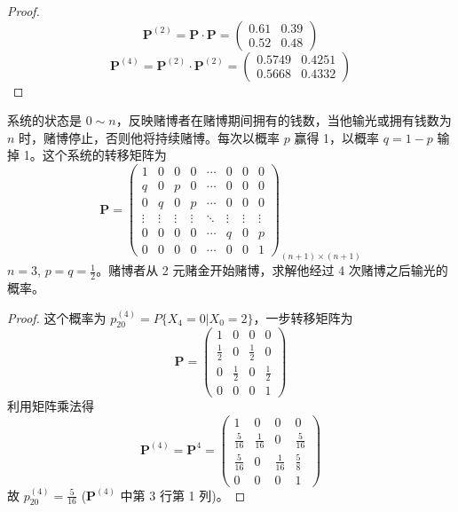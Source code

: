 \documentclass[lang=cn,10pt,thmcnt=section]{elegantbook}
\begin{document}
\begin{proof}
	\[
\mathbf{P}^{(2)} = \mathbf{P} \cdot \mathbf{P} = \begin{pmatrix}
0.61 & 0.39 \\
0.52 & 0.48
\end{pmatrix}
\]
\[
\mathbf{P}^{(4)} = \mathbf{P}^{(2)} \cdot \mathbf{P}^{(2)} = \begin{pmatrix}
0.5749 & 0.4251 \\
0.5668 & 0.4332
\end{pmatrix}
\]
\end{proof}
\begin{example}
	系统的状态是 $0 \sim n$，反映赌博者在赌博期间拥有的钱数，当他输光或拥有钱数为 $n$ 时，赌博停止，否则他将持续赌博。每次以概率 $p$ 赢得 1，以概率 $q = 1 - p$ 输掉 1。这个系统的转移矩阵为
\[
\mathbf{P} = \begin{pmatrix}
1 & 0 & 0 & 0 & \cdots & 0 & 0 & 0 \\
q & 0 & p & 0 & \cdots & 0 & 0 & 0 \\
0 & q & 0 & p & \cdots & 0 & 0 & 0 \\
\vdots & \vdots & \vdots & \vdots & \ddots & \vdots & \vdots & \vdots \\
0 & 0 & 0 & 0 & \cdots & q & 0 & p \\
0 & 0 & 0 & 0 & \cdots & 0 & 0 & 1
\end{pmatrix}_{(n+1) \times (n+1)}
\]
$n = 3$, $p = q = \frac{1}{2}$。赌博者从 2 元赌金开始赌博，求解他经过 4 次赌博之后输光的概率。
\end{example}
\begin{proof}
	这个概率为 $p_{20}^{(4)} = P\{X_4 = 0 | X_0 = 2\}$，一步转移矩阵为
\[
\mathbf{P} = \begin{pmatrix}
1 & 0 & 0 & 0 \\
\frac{1}{2} & 0 & \frac{1}{2} & 0 \\
0 & \frac{1}{2} & 0 & \frac{1}{2} \\
0 & 0 & 0 & 1
\end{pmatrix}
\]
利用矩阵乘法得
\[
\mathbf{P}^{(4)} = \mathbf{P}^4 = \begin{pmatrix}
1 & 0 & 0 & 0 \\
\frac{5}{16} & \frac{1}{16} & 0 & \frac{5}{16} \\
\frac{5}{16} & 0 & \frac{1}{16} & \frac{5}{8} \\
0 & 0 & 0 & 1
\end{pmatrix}
\]
故 $p_{20}^{(4)} = \frac{5}{16}$ ($\mathbf{P}^{(4)}$ 中第 3 行第 1 列)。

\end{proof}
\end{document}

